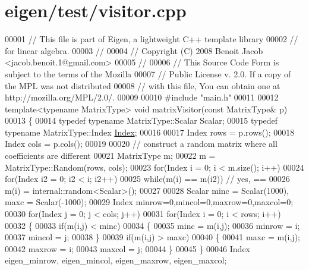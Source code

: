 \hypertarget{eigen_2test_2visitor_8cpp_source}{}\section{eigen/test/visitor.cpp}
\label{eigen_2test_2visitor_8cpp_source}

\begin{DoxyCode}
00001 \textcolor{comment}{// This file is part of Eigen, a lightweight C++ template library}
00002 \textcolor{comment}{// for linear algebra.}
00003 \textcolor{comment}{//}
00004 \textcolor{comment}{// Copyright (C) 2008 Benoit Jacob <jacob.benoit.1@gmail.com>}
00005 \textcolor{comment}{//}
00006 \textcolor{comment}{// This Source Code Form is subject to the terms of the Mozilla}
00007 \textcolor{comment}{// Public License v. 2.0. If a copy of the MPL was not distributed}
00008 \textcolor{comment}{// with this file, You can obtain one at http://mozilla.org/MPL/2.0/.}
00009 
00010 \textcolor{preprocessor}{#include "main.h"}
00011 
00012 \textcolor{keyword}{template}<\textcolor{keyword}{typename} MatrixType> \textcolor{keywordtype}{void} matrixVisitor(\textcolor{keyword}{const} MatrixType& p)
00013 \{
00014   \textcolor{keyword}{typedef} \textcolor{keyword}{typename} MatrixType::Scalar Scalar;
00015   \textcolor{keyword}{typedef} \textcolor{keyword}{typename} MatrixType::Index \hyperlink{namespace_eigen_a62e77e0933482dafde8fe197d9a2cfde}{Index};
00016 
00017   Index rows = p.rows();
00018   Index cols = p.cols();
00019 
00020   \textcolor{comment}{// construct a random matrix where all coefficients are different}
00021   MatrixType m;
00022   m = MatrixType::Random(rows, cols);
00023   \textcolor{keywordflow}{for}(Index i = 0; i < m.size(); i++)
00024     \textcolor{keywordflow}{for}(Index i2 = 0; i2 < i; i2++)
00025       \textcolor{keywordflow}{while}(m(i) == m(i2)) \textcolor{comment}{// yes, ==}
00026         m(i) = internal::random<Scalar>();
00027   
00028   Scalar minc = Scalar(1000), maxc = Scalar(-1000);
00029   Index minrow=0,mincol=0,maxrow=0,maxcol=0;
00030   \textcolor{keywordflow}{for}(Index j = 0; j < cols; j++)
00031   \textcolor{keywordflow}{for}(Index i = 0; i < rows; i++)
00032   \{
00033     \textcolor{keywordflow}{if}(m(i,j) < minc)
00034     \{
00035       minc = m(i,j);
00036       minrow = i;
00037       mincol = j;
00038     \}
00039     \textcolor{keywordflow}{if}(m(i,j) > maxc)
00040     \{
00041       maxc = m(i,j);
00042       maxrow = i;
00043       maxcol = j;
00044     \}
00045   \}
00046   Index eigen\_minrow, eigen\_mincol, eigen\_maxrow, eigen\_maxcol;

\end{DoxyCode}
